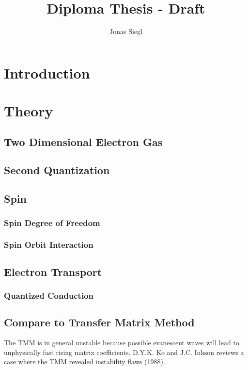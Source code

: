 
\author{Jonas Siegl}
\title{Diploma Thesis - Draft}




\maketitle

\thispagestyle{plain}


\tableofcontents
\clearpage
\section{Introduction}
\section{Theory}
  \subsection{Two Dimensional Electron Gas}
  \subsection{Second Quantization}
  \subsection{Spin}
    \subsubsection{Spin Degree of Freedom}
    \subsubsection{Spin Orbit Interaction}
  \subsection{Electron Transport}
    \subsubsection{Quantized Conduction}
  \subsection{Compare to Transfer Matrix Method}
  The TMM is in general unstable because possible evanescent waves will lead to unphysically fast rising matrix coefficients.
  D.Y.K. Ko and J.C. Inkson reviews a case where the TMM revealed instability flaws (1988).
